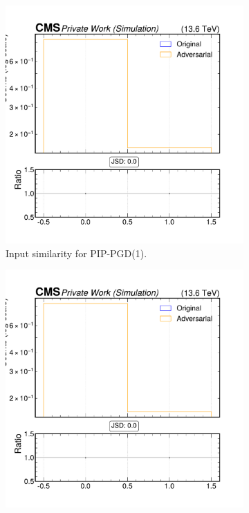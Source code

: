 \begin{figure}[htbp]
  \centering
  \begin{subfigure}[t]{0.32\textwidth}
    \includegraphics[width=\linewidth]{media/output/features/compare/combined_it_1/cmp_npf_arr_Npfcan_puppiw.pdf}
    \caption*{Input similarity for PIP-PGD(1).}
  \end{subfigure}\hfill
  \begin{subfigure}[t]{0.32\textwidth}
    \includegraphics[width=\linewidth]{media/output/features/compare/combined_it_2/cmp_npf_arr_Npfcan_puppiw.pdf}

\end{subfigure}
\end{figure}
